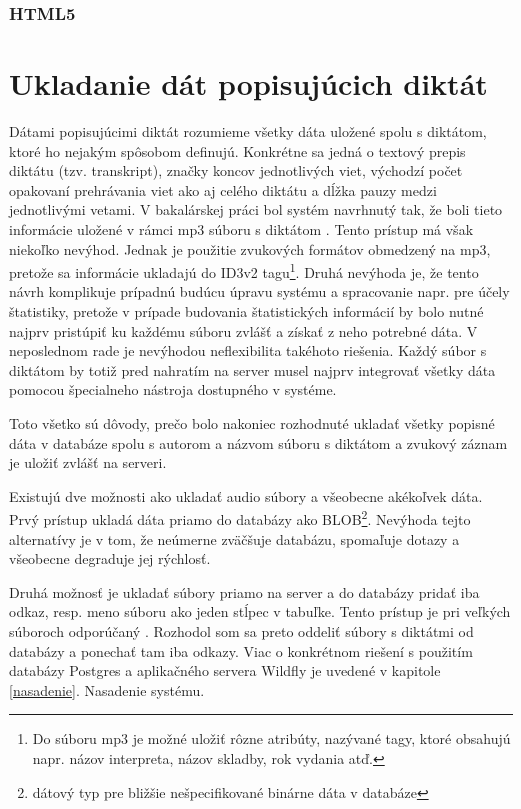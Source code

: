 \documentclass[12pt,oneside]{fithesis2}
\begin{document}
      		\subsubsection{HTML5}
      		\pagebreak
	\section{Ukladanie dát popisujúcich diktát}
	\par Dátami popisujúcimi diktát rozumieme všetky dáta uložené spolu s diktátom, ktoré ho nejakým spôsobom definujú. Konkrétne sa jedná o textový prepis diktátu (tzv. transkript), značky koncov jednotlivých viet, východzí počet opakovaní prehrávania viet ako aj celého diktátu a dĺžka pauzy medzi jednotlivými vetami. V bakalárskej práci bol systém navrhnutý tak, že boli tieto informácie uložené v rámci mp3 súboru s diktátom \cite{rumanov12}. Tento prístup má však niekoľko nevýhod. Jednak je použitie zvukových formátov obmedzený na mp3, pretože sa informácie ukladajú do ID3v2 tagu\footnote{Do súboru mp3 je možné uložiť rôzne atribúty, nazývané tagy, ktoré obsahujú napr. názov interpreta, názov skladby, rok vydania atď.}. Druhá nevýhoda je, že tento návrh komplikuje prípadnú budúcu úpravu systému a spracovanie napr. pre účely štatistiky, pretože v prípade budovania štatistických informácií by bolo nutné najprv pristúpiť ku každému súboru zvlášť a získať z neho potrebné dáta. V neposlednom rade je nevýhodou neflexibilita takéhoto riešenia. Každý súbor s diktátom by totiž pred nahratím na server musel najprv integrovať všetky dáta pomocou špecialneho nástroja dostupného v systéme.
	\par Toto všetko sú dôvody, prečo bolo nakoniec rozhodnuté ukladať všetky popisné dáta v databáze spolu s autorom a názvom súboru s diktátom a zvukový záznam je uložiť zvlášť na serveri. 
      \par Existujú dve možnosti ako ukladať audio súbory a všeobecne akékoľvek dáta. Prvý prístup ukladá dáta priamo do databázy ako BLOB\footnote{dátový typ pre bližšie nešpecifikované binárne dáta v databáze}. Nevýhoda tejto alternatívy je v tom, že neúmerne zväčšuje databázu, spomaľuje dotazy a všeobecne degraduje jej rýchlosť.
      \par Druhá možnosť je ukladať súbory priamo na server a do databázy pridať iba odkaz, resp. meno súboru ako jeden stĺpec v tabuľke. Tento prístup je pri veľkých súboroch odporúčaný \cite{sof1}. Rozhodol som sa preto oddeliť súbory s diktátmi od databázy a ponechať tam iba odkazy. Viac o konkrétnom riešení s použitím databázy Postgres a aplikačného servera Wildfly je uvedené v kapitole \ref{nasadenie}. Nasadenie systému.
     
\end{document}
